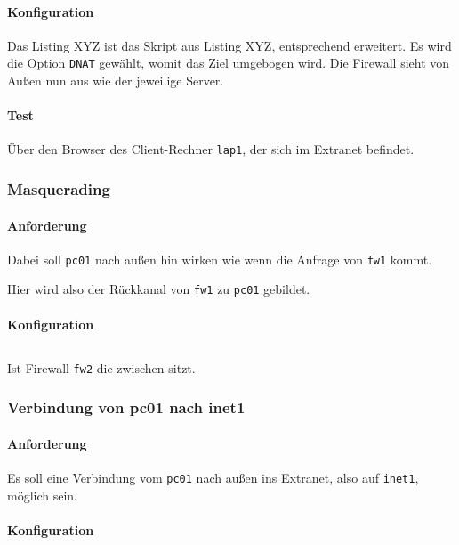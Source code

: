 \paragraph{Konfiguration} Das Listing XYZ ist das Skript
aus Listing XYZ, entsprechend erweitert.
Es wird die Option {\tt DNAT} gewählt, womit das Ziel umgebogen wird.
Die Firewall sieht von Außen nun aus wie der jeweilige Server.


\paragraph{Test} Über den Browser des Client-Rechner {\tt lap1},
der sich im Extranet befindet.


\subsubsection{Masquerading}

\paragraph{Anforderung}
Dabei soll {\tt pc01} nach außen hin wirken wie wenn die Anfrage von
{\tt fw1} kommt.

Hier wird also der Rückkanal von {\tt fw1} zu {\tt pc01} gebildet.

\paragraph{Konfiguration}


\subsection{\fwb}

Ist Firewall {\tt fw2} die zwischen \fwb sitzt.

\subsubsection{Verbindung von pc01 nach inet1}

\paragraph{Anforderung} Es soll eine Verbindung vom {\tt pc01} nach
außen ins Extranet, also auf {\tt inet1}, möglich sein.


\paragraph{Konfiguration}

